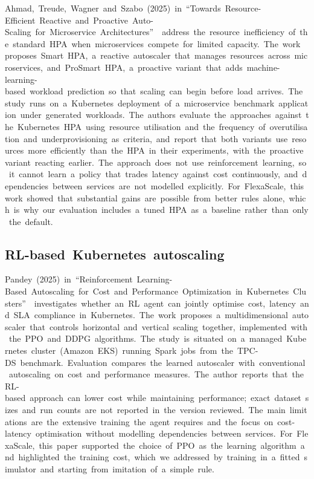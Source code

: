 \documentclass[12pt,a4paper,oneside]{report}
\begin{document}
Ahmad,~Treude,~Wagner~and~Szabo~(2025)~in~``Towards~Resource-Efficient~Reactive~and~Proactive~Auto-Scaling~for~Microservice~Architectures''~\cite{smarthpa}~address~the~resource~inefficiency~of~the~standard~HPA~when~microservices~compete~for~limited~capacity.~The~work~proposes~Smart~HPA,~a~reactive~autoscaler~that~manages~resources~across~microservices,~and~ProSmart~HPA,~a~proactive~variant~that~adds~machine-learning-based~workload~prediction~so~that~scaling~can~begin~before~load~arrives.~The~study~runs~on~a~Kubernetes~deployment~of~a~microservice~benchmark~application~under~generated~workloads.~The~authors~evaluate~the~approaches~against~the~Kubernetes~HPA~using~resource~utilisation~and~the~frequency~of~overutilisation~and~underprovisioning~as~criteria,~and~report~that~both~variants~use~resources~more~efficiently~than~the~HPA~in~their~experiments,~with~the~proactive~variant~reacting~earlier.~The~approach~does~not~use~reinforcement~learning,~so~it~cannot~learn~a~policy~that~trades~latency~against~cost~continuously,~and~dependencies~between~services~are~not~modelled~explicitly.~For~FlexaScale,~this~work~showed~that~substantial~gains~are~possible~from~better~rules~alone,~which~is~why~our~evaluation~includes~a~tuned~HPA~as~a~baseline~rather~than~only~the~default.


\clearpage

\subsection{RL-based~Kubernetes~autoscaling}

Pandey~(2025)~in~``Reinforcement~Learning-Based~Autoscaling~for~Cost~and~Performance~Optimization~in~Kubernetes~Clusters''~\cite{pandey}~investigates~whether~an~RL~agent~can~jointly~optimise~cost,~latency~and~SLA~compliance~in~Kubernetes.~The~work~proposes~a~multidimensional~autoscaler~that~controls~horizontal~and~vertical~scaling~together,~implemented~with~the~PPO~and~DDPG~algorithms.~The~study~is~situated~on~a~managed~Kubernetes~cluster~(Amazon~EKS)~running~Spark~jobs~from~the~TPC-DS~benchmark.~Evaluation~compares~the~learned~autoscaler~with~conventional~autoscaling~on~cost~and~performance~measures.~The~author~reports~that~the~RL-based~approach~can~lower~cost~while~maintaining~performance;~exact~dataset~sizes~and~run~counts~are~not~reported~in~the~version~reviewed.~The~main~limitations~are~the~extensive~training~the~agent~requires~and~the~focus~on~cost-latency~optimisation~without~modelling~dependencies~between~services.~For~FlexaScale,~this~paper~supported~the~choice~of~PPO~as~the~learning~algorithm~and~highlighted~the~training~cost,~which~we~addressed~by~training~in~a~fitted~simulator~and~starting~from~imitation~of~a~simple~rule.
\end{document}
